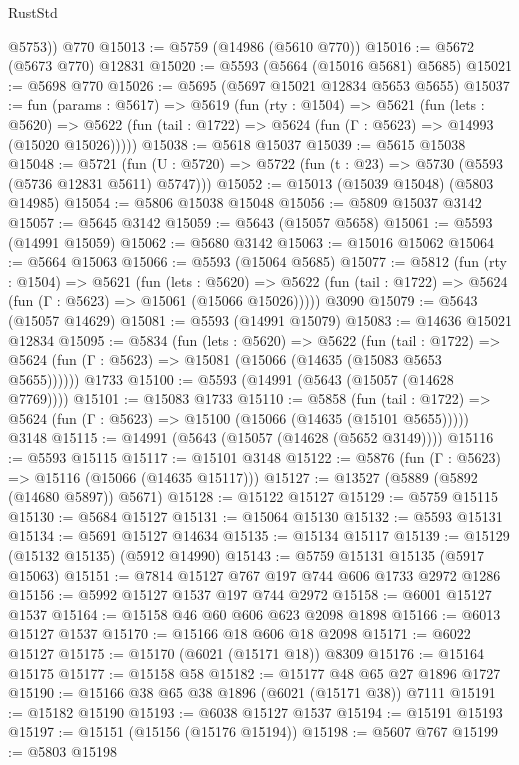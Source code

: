 \begin{lexlean}{RustStd}
\begin{coremodule}
        @5753))
    @770
@15013 := @5759 (@14986 (@5610 @770))
@15016 := @5672 (@5673 @770) @12831
@15020 := @5593 (@5664 (@15016 @5681) @5685)
@15021 := @5698 @770
@15026 := @5695 (@5697 @15021 @12834 @5653 @5655)
@15037 := fun (params : @5617) =>
  @5619
    (fun (rty : @1504) =>
    @5621
      (fun (lets : @5620) =>
      @5622 (fun (tail : @1722) => @5624 (fun (Γ : @5623) => @14993 (@15020 @15026)))))
@15038 := @5618 @15037
@15039 := @5615 @15038
@15048 := @5721
    (fun (U : @5720) => @5722 (fun (t : @23) => @5730 (@5593 (@5736 @12831 @5611) @5747)))
@15052 := @15013 (@15039 @15048) (@5803 @14985)
@15054 := @5806 @15038 @15048
@15056 := @5809 @15037 @3142
@15057 := @5645 @3142
@15059 := @5643 (@15057 @5658)
@15061 := @5593 (@14991 @15059)
@15062 := @5680 @3142
@15063 := @15016 @15062
@15064 := @5664 @15063
@15066 := @5593 (@15064 @5685)
@15077 := @5812
    (fun (rty : @1504) =>
    @5621
      (fun (lets : @5620) =>
      @5622 (fun (tail : @1722) => @5624 (fun (Γ : @5623) => @15061 (@15066 @15026)))))
    @3090
@15079 := @5643 (@15057 @14629)
@15081 := @5593 (@14991 @15079)
@15083 := @14636 @15021 @12834
@15095 := @5834
    (fun (lets : @5620) =>
    @5622
      (fun (tail : @1722) =>
      @5624 (fun (Γ : @5623) => @15081 (@15066 (@14635 (@15083 @5653 @5655))))))
    @1733
@15100 := @5593 (@14991 (@5643 (@15057 (@14628 @7769))))
@15101 := @15083 @1733
@15110 := @5858
    (fun (tail : @1722) => @5624 (fun (Γ : @5623) => @15100 (@15066 (@14635 (@15101 @5655)))))
    @3148
@15115 := @14991 (@5643 (@15057 (@14628 (@5652 @3149))))
@15116 := @5593 @15115
@15117 := @15101 @3148
@15122 := @5876 (fun (Γ : @5623) => @15116 (@15066 (@14635 @15117)))
@15127 := @13527 (@5889 (@5892 (@14680 @5897)) @5671)
@15128 := @15122 @15127
@15129 := @5759 @15115
@15130 := @5684 @15127
@15131 := @15064 @15130
@15132 := @5593 @15131
@15134 := @5691 @15127 @14634
@15135 := @15134 @15117
@15139 := @15129 (@15132 @15135) (@5912 @14990)
@15143 := @5759 @15131 @15135 (@5917 @15063)
@15151 := @7814 @15127 @767 @197 @744 @606 @1733 @2972 @1286
@15156 := @5992 @15127 @1537 @197 @744 @2972
@15158 := @6001 @15127 @1537
@15164 := @15158 @46 @60 @606 @623 @2098 @1898
@15166 := @6013 @15127 @1537
@15170 := @15166 @18 @606 @18 @2098
@15171 := @6022 @15127
@15175 := @15170 (@6021 (@15171 @18)) @8309
@15176 := @15164 @15175
@15177 := @15158 @58
@15182 := @15177 @48 @65 @27 @1896 @1727
@15190 := @15166 @38 @65 @38 @1896 (@6021 (@15171 @38)) @7111
@15191 := @15182 @15190
@15193 := @6038 @15127 @1537
@15194 := @15191 @15193
@15197 := @15151 (@15156 (@15176 @15194))
@15198 := @5607 @767
@15199 := @5803 @15198

\end{coremodule}
\end{lexlean}
